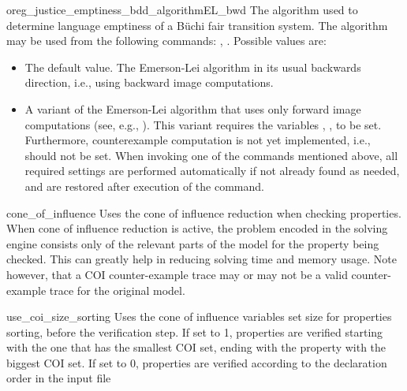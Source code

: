 \begin{nusmvVar} {oreg\_justice\_emptiness\_bdd\_algorithm}{}{EL_bwd}
The algorithm used to determine language emptiness of a B\"uchi fair transition system.
%
The algorithm may be used from the following commands: , . %
%
Possible values are:
\begin{itemize}
\item {} The default value. The Emerson-Lei algorithm \cite{DBLP:conf/lics/EmersonL86} in its usual backwards direction, i.e., using backward image computations.
\item {} A variant of the Emerson-Lei algorithm that uses only forward image computations (see, e.g., \cite{THenzingerOKupfermanSQadeer-FMSD-2003}). This variant requires the variables , ,  to be set. Furthermore, counterexample computation is not yet implemented, i.e.,  should not be set. When invoking one of the commands mentioned above, all required settings are performed automatically if not already found as needed, and are restored after execution of the command.
\end{itemize}
\end{nusmvVar}










\begin{nusmvVar} {cone\_of\_influence}{}{}
Uses the cone of influence reduction when checking properties. When
cone of influence reduction is active, the problem encoded in the
solving engine consists only of the relevant parts of the model for
the property being checked. This can greatly help in reducing solving
time and memory usage.  Note however, that a COI counter-example trace
may or may not be a valid counter-example trace for the original model.
\end{nusmvVar}

\begin{nusmvVar} {use\_coi\_size\_sorting}{}{}
Uses the cone of influence variables set size for properties sorting,
before the verification step. If set to 1, properties are verified
starting with the one that has the smallest COI set, ending with the
property with the biggest COI set. If set to 0, properties are
verified according to the declaration order in the input file
\end{nusmvVar}


